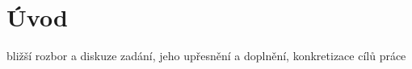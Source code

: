 \chapter*{Úvod}
{}

bližší rozbor a diskuze zadání, jeho upřesnění a doplnění, konkretizace cílů práce
